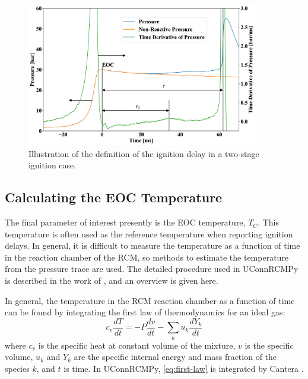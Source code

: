 \documentclass[12pt]{../ussci}
\begin{document}
\begin{figure}[htbp]
\centering
\includegraphics[width=0.9\textwidth]{figures/ign-delay-def.png}
\caption{Illustration of the definition of the ignition delay in a
two-stage ignition case.}
\label{fig:ign-delay-def}
\end{figure}

\subsection{Calculating the EOC Temperature}\label{calculating-the-eoc-temperature}

The final parameter of interest presently is the EOC temperature,
\(T_C\). This temperature is often used as the reference temperature
when reporting ignition delays. In general, it is difficult to measure
the temperature as a function of time in the reaction chamber of the
RCM, so methods to estimate the temperature from the pressure trace are
used. The detailed procedure used in UConnRCMPy is described in the work
of \textcite{Dames2016}, and an overview is given here.

In general, the temperature in the RCM reaction chamber as a function of
time can be found by integrating the first law of thermodynamics for an
ideal gas:
%
\begin{equation} \label{eq:first-law}
    c_v \frac{dT}{dt} = -P \frac{dv}{dt} - \sum_k u_k \frac{d Y_k}{dt}
\end{equation}
%
where \(c_v\) is the specific heat at constant volume of the mixture,
\(v\) is the specific volume, \(u_k\) and \(Y_k\) are the specific
internal energy and mass fraction of the species \(k\), and \(t\) is
time. In UConnRCMPy, \cref{eq:first-law} is integrated by Cantera
\autocite{cantera}.
\end{document}
